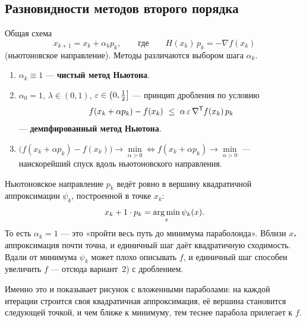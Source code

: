 
\subsection{Разновидности методов второго порядка}
\label{subsec:newton-variants}

Общая схема
\[
  x_{k+1} = x_k + \alpha_k p_k ,
  \qquad\text{где}\qquad
  H(x_k)\, p_k = -\nabla f(x_k)
\]
(ньютоновское направление). Методы различаются выбором шага $\alpha_k$.

\begin{enumerate}[label=\arabic*),left=0pt]
  \item $\alpha_k \equiv 1$ — \textbf{чистый метод Ньютона}.
  \item $\alpha_0 = 1$, $\lambda \in (0,1)$, $\varepsilon \in \big(0, \tfrac12\big]$ —
        принцип дробления по условию
        \begin{equation}\label{eq:newton-armijo}
          f(x_k + \alpha p_k) - f(x_k)
          \ \le\ \alpha\,\varepsilon\,\nabla^{\mathsf{T}} f(x_k)\, p_k
        \end{equation}
        — \textbf{демпфированный метод Ньютона}.
  \item $\big(f(x_k + \alpha p_k) - f(x_k)\big) \to \min\limits_{\alpha > 0}
        \iff f(x_k + \alpha p_k) \to \min\limits_{\alpha > 0}$ —
        наискорейший спуск вдоль ньютоновского направления.
\end{enumerate}


\begin{idea}[title={Почему единичный шаг}]
Ньютоновское направление $p_k$ ведёт ровно в вершину квадратичной
аппроксимации $\psi_k$, построенной в точке $x_k$:
\[
  x_k + 1 \cdot p_k = \operatorname*{arg\,min}_x \psi_k(x) .
\]
То есть $\alpha_k = 1$ — это «пройти весь путь до минимума параболоида».
Вблизи $x_*$ аппроксимация почти точна, и единичный шаг даёт квадратичную
сходимость. Вдали от минимума $\psi_k$ может плохо описывать $f$, и
единичный шаг способен увеличить $f$ — отсюда вариант~2) с дроблением.

Именно это и показывает рисунок с вложенными параболами: на каждой итерации
строится своя квадратичная аппроксимация, её вершина становится следующей
точкой, и чем ближе к минимуму, тем теснее парабола прилегает к $f$.
\end{idea}

